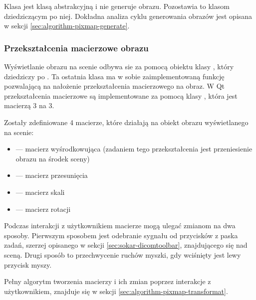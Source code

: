 Klasa  jest klasą abstrakcyjną i nie generuje obrazu.
Pozostawia to klasom dziedziczącym po niej.
Dokładna analiza cyklu generowania obrazów jest opisana w sekcji \ref{sec:algorithm-pixmap-generate}.

\subsubsection{Przekształcenia macierzowe obrazu}

\par
Wyświetlanie obrazu na scenie odbywa sie za pomocą obiektu klasy , który dziedziczy po .
Ta ostatnia klasa ma w sobie zaimplementowaną funkcję pozwalającą na nałożenie przekształcenia macierzowego na obraz.
W Qt przekształcenia macierzowe są implementowane za pomocą klasy , która jest macierzą 3 na 3.

Zostały zdefiniowane 4 macierze, które działają na obiekt obrazu wyświetlanego na scenie:
\begin{itemize}
    \item {} --- macierz wyśrodkowująca (zadaniem tego przekształcenia jest przeniesienie obrazu na środek sceny)
    \item {} --- macierz przesunięcia
    \item {} --- macierz skali
    \item {} --- macierz rotacji
\end{itemize}

\par
Podczas interakcji z użytkownikiem macierze mogą ulegać zmianom na dwa sposoby.
Pierwszym sposobem jest odebranie sygnału od przycisków z paska zadań, szerzej opisanego w sekcji \ref{sec:sokar-dicomtoolbar}, znajdującego się nad sceną.
Drugi sposób to przechwycenie ruchów myszki, gdy wciśnięty jest lewy przycisk myszy.
\par
Pełny algorytm tworzenia macierzy i ich zmian poprzez interakcje z użytkownikiem, znajduje się w sekcji \ref{sec:algorithm-pixmap-transformat}.